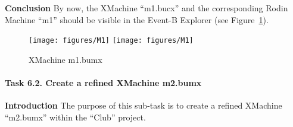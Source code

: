 \textbf{Conclusion} By now, the XMachine ``m1.bucx'' and the corresponding Rodin Machine ``m1'' should be visible in the Event-B Explorer (see Figure~\ref{fig:M1}).
  \begin{figure}[!htbp]
    \centering
    \texttt{[image: figures/M1]}
    \else
    \texttt{[image: figures/M1]}
    \endif
    \caption{XMachine m1.bumx}
    \label{fig:M1}
  \end{figure}

\paragraph{Task 6.2. Create a refined XMachine m2.bumx}
\textbf{Introduction} The purpose of this sub-task is to create a refined XMachine ``m2.bumx'' within the ``Club'' project.

